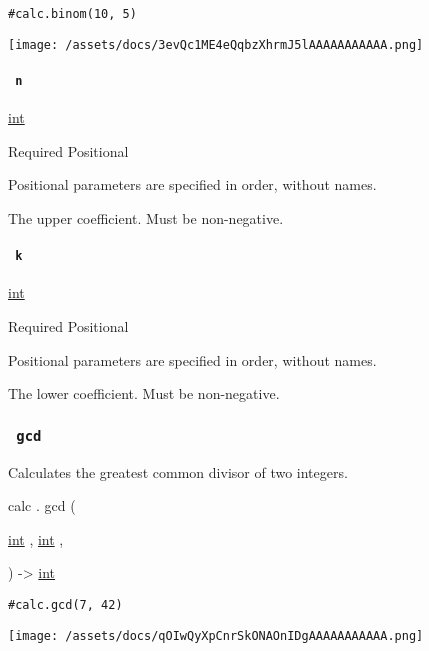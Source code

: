 \begin{verbatim}
#calc.binom(10, 5)
\end{verbatim}

\texttt{[image: /assets/docs/3evQc1ME4eQqbzXhrmJ5lAAAAAAAAAAA.png]}

\paragraph{\texorpdfstring{\texttt{\ n\ }}{ n }}\label{functions-binom-n}

\href{/docs/reference/foundations/int/}{int}

{Required} {{ Positional }}

\label{functions-binom-n-positional-tooltip}
Positional parameters are specified in order, without names.

The upper coefficient. Must be non-negative.

\paragraph{\texorpdfstring{\texttt{\ k\ }}{ k }}\label{functions-binom-k}

\href{/docs/reference/foundations/int/}{int}

{Required} {{ Positional }}

\label{functions-binom-k-positional-tooltip}
Positional parameters are specified in order, without names.

The lower coefficient. Must be non-negative.

\subsubsection{\texorpdfstring{\texttt{\ gcd\ }}{ gcd }}\label{functions-gcd}

Calculates the greatest common divisor of two integers.

calc { . } { gcd } (

{ \href{/docs/reference/foundations/int/}{int} , } {
\href{/docs/reference/foundations/int/}{int} , }

) -\textgreater{} \href{/docs/reference/foundations/int/}{int}

\begin{verbatim}
#calc.gcd(7, 42)
\end{verbatim}

\texttt{[image: /assets/docs/qOIwQyXpCnrSkONAOnIDgAAAAAAAAAAA.png]}

